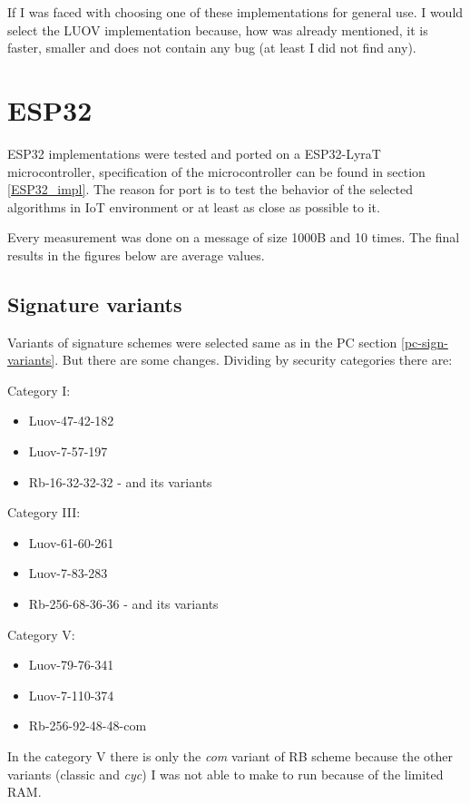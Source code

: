 \documentclass[thesis=M,english]{FITthesis}[2019/12/23]
\begin{document}
\bigskip
\noindent
If I was faced with choosing one of these implementations for general use. I would select the LUOV implementation because, how was already mentioned, it is faster, smaller and does not contain any bug (at least I did not find any).

\newpage
\section{ESP32}
ESP32 implementations were tested and ported on a ESP32-LyraT microcontroller, specification of the microcontroller can be found in section \ref{ESP32_impl}. The reason for port is to test the behavior of the selected algorithms in IoT environment or at least as close as possible to it.

\bigskip
\noindent
Every measurement was done on a message of size 1000B and 10 times. The final results in the figures below are average values.

\subsection{Signature variants}
Variants of signature schemes were selected same as in the PC section \ref{pc-sign-variants}. But there are some changes. Dividing by security categories there are:

\bigskip
\noindent
Category I:
\begin{itemize}
\item Luov-47-42-182
\item Luov-7-57-197
\item Rb-16-32-32-32 - and its variants
\end{itemize}

\noindent
Category III:
\begin{itemize}
\item Luov-61-60-261
\item Luov-7-83-283
\item Rb-256-68-36-36 - and its variants
\end{itemize}

\noindent
Category V:
\begin{itemize}
\item Luov-79-76-341
\item Luov-7-110-374
\item Rb-256-92-48-48-com
\end{itemize}

\noindent
In the category V there is only the \textit{com} variant of RB scheme because the other variants (classic and \textit{cyc}) I was not able to make to run because of the limited RAM.
\end{document}
